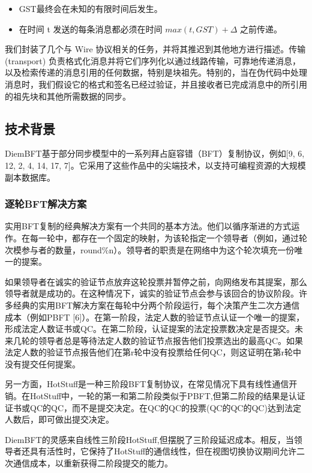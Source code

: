 \begin{itemize}
    \item GST最终会在未知的有限时间后发生。
    \item 在时间 t 发送的每条消息都必须在时间 $ max(t,GST) + \Delta$ 之前传递。
\end{itemize}

我们封装了几个与 Wire 协议相关的任务，并将其推迟到其他地方进行描述。传输(transport) 负责格式化消息并将它们序列化以通过线路传输，可靠地传递消息，以及检索传递的消息引用的任何数据，特别是块祖先。特别的，当在伪代码中处理消息时，我们假设它的格式和签名已经过验证，并且接收者已完成消息中的所引用的祖先块和其他所需数据的同步。

\subsection{技术背景}

DiemBFT基于部分同步模型中的一系列拜占庭容错（BFT）复制协议，例如[9, 6, 12, 2, 4, 14, 17, 7]。它采用了这些作品中的尖端技术，以支持可编程资源的大规模副本数据库。

\subsubsection{逐轮BFT解决方案}

实用BFT复制的经典解决方案有一个共同的基本方法。他们以循序渐进的方式运作。在每一轮中，都存在一个固定的映射，为该轮指定一个领导者（例如，通过轮次模参与者的数量，round\%n）。领导者的职责是在网络中为这个轮次填充一份唯一的提案。

如果领导者在诚实的验证节点放弃这轮投票并暂停之前，向网络发布其提案，那么领导者就是成功的。在这种情况下，诚实的验证节点会参与该回合的协议阶段。许多经典的实用BFT解决方案在每轮中分两个阶段运行，每个决策产生二次方通信成本（例如PBFT [6]）。在第一阶段，法定人数的验证节点认证一个唯一的提案，形成法定人数证书或QC。在第二阶段，认证提案的法定投票数决定是否提交。未来几轮的领导者总是等待法定人数的验证节点报告他们投票选出的最高QC。如果法定人数的验证节点报告他们在第r轮中没有投票给任何QC，则这证明在第r轮中没有提交任何提案。

另一方面，HotStuff是一种三阶段BFT复制协议，在常见情况下具有线性通信开销。在HotStuff中，一轮的第一和第二阶段类似于PBFT,但第二阶段的结果是认证证书或QC的QC，而不是提交决定。在QC的QC的投票(QC的QC的QC)达到法定人数后，即可做出提交决定。

DiemBFT的灵感来自线性三阶段HotStuff,但摆脱了三阶段延迟成本。相反，当领导者还具有活性时，它保持了HotStuff的通信线性，但在视图切换协议期间允许二次通信成本，以重新获得二阶段提交的能力。

